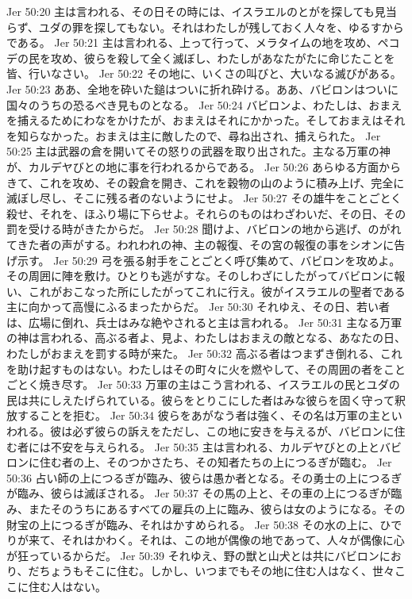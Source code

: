 Jer 50:20  主は言われる、その日その時には、イスラエルのとがを探しても見当らず、ユダの罪を探してもない。それはわたしが残しておく人々を、ゆるすからである。
Jer 50:21  主は言われる、上って行って、メラタイムの地を攻め、ペコデの民を攻め、彼らを殺して全く滅ぼし、わたしがあなたがたに命じたことを皆、行いなさい。
Jer 50:22  その地に、いくさの叫びと、大いなる滅びがある。
Jer 50:23  ああ、全地を砕いた鎚はついに折れ砕ける。ああ、バビロンはついに国々のうちの恐るべき見ものとなる。
Jer 50:24  バビロンよ、わたしは、おまえを捕えるためにわなをかけたが、おまえはそれにかかった。そしておまえはそれを知らなかった。おまえは主に敵したので、尋ね出され、捕えられた。
Jer 50:25  主は武器の倉を開いてその怒りの武器を取り出された。主なる万軍の神が、カルデヤびとの地に事を行われるからである。
Jer 50:26  あらゆる方面からきて、これを攻め、その穀倉を開き、これを穀物の山のように積み上げ、完全に滅ぼし尽し、そこに残る者のないようにせよ。
Jer 50:27  その雄牛をことごとく殺せ、それを、ほふり場に下らせよ。それらのものはわざわいだ、その日、その罰を受ける時がきたからだ。
Jer 50:28  聞けよ、バビロンの地から逃げ、のがれてきた者の声がする。われわれの神、主の報復、その宮の報復の事をシオンに告げ示す。
Jer 50:29  弓を張る射手をことごとく呼び集めて、バビロンを攻めよ。その周囲に陣を敷け。ひとりも逃がすな。そのしわざにしたがってバビロンに報い、これがおこなった所にしたがってこれに行え。彼がイスラエルの聖者である主に向かって高慢にふるまったからだ。
Jer 50:30  それゆえ、その日、若い者は、広場に倒れ、兵士はみな絶やされると主は言われる。
Jer 50:31  主なる万軍の神は言われる、高ぶる者よ、見よ、わたしはおまえの敵となる、あなたの日、わたしがおまえを罰する時が来た。
Jer 50:32  高ぶる者はつまずき倒れる、これを助け起すものはない。わたしはその町々に火を燃やして、その周囲の者をことごとく焼き尽す。
Jer 50:33  万軍の主はこう言われる、イスラエルの民とユダの民は共にしえたげられている。彼らをとりこにした者はみな彼らを固く守って釈放することを拒む。
Jer 50:34  彼らをあがなう者は強く、その名は万軍の主といわれる。彼は必ず彼らの訴えをただし、この地に安きを与えるが、バビロンに住む者には不安を与えられる。
Jer 50:35  主は言われる、カルデヤびとの上とバビロンに住む者の上、そのつかさたち、その知者たちの上につるぎが臨む。
Jer 50:36  占い師の上につるぎが臨み、彼らは愚か者となる。その勇士の上につるぎが臨み、彼らは滅ぼされる。
Jer 50:37  その馬の上と、その車の上につるぎが臨み、またそのうちにあるすべての雇兵の上に臨み、彼らは女のようになる。その財宝の上につるぎが臨み、それはかすめられる。
Jer 50:38  その水の上に、ひでりが来て、それはかわく。それは、この地が偶像の地であって、人々が偶像に心が狂っているからだ。
Jer 50:39  それゆえ、野の獣と山犬とは共にバビロンにおり、だちょうもそこに住む。しかし、いつまでもその地に住む人はなく、世々ここに住む人はない。
